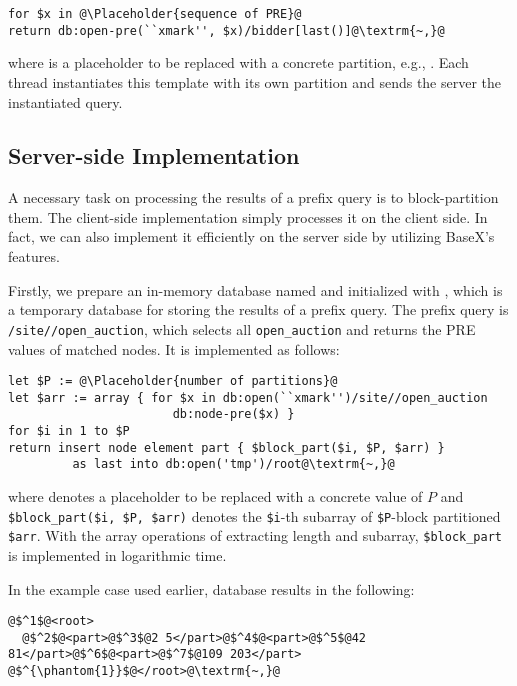 \vspace{10mm}
\begin{lstlisting}[escapechar=\@]
for $x in @\Placeholder{sequence of PRE}@
return db:open-pre(``xmark'', $x)/bidder[last()]@\textrm{~,}@
\end{lstlisting}
where  is a placeholder to be replaced with a
concrete partition, e.g., . Each thread instantiates this template
with its own partition and sends the server the instantiated query.


\subsection{Server-side Implementation}

A necessary task on processing the results of a prefix query is to
block-partition them. The client-side implementation simply processes it on the
client side. In fact, we can also implement it efficiently on the server side by
utilizing BaseX's features.

Firstly, we prepare an in-memory database named  and initialized
with , which is a temporary database for storing the results
of a prefix query. The prefix query is \texttt{/site//open\_auction}, which
selects all \texttt{open\_auction} and returns the PRE values of matched nodes.
It is implemented as follows:

\begin{lstlisting}[escapechar=\@]
let $P := @\Placeholder{number of partitions}@
let $arr := array { for $x in db:open(``xmark'')/site//open_auction
                       db:node-pre($x) }
for $i in 1 to $P
return insert node element part { $block_part($i, $P, $arr) }
         as last into db:open('tmp')/root@\textrm{~,}@
\end{lstlisting}

where  denotes a placeholder to be replaced
with a concrete value of $P$ and \verb|$block_part($i, $P, $arr)| denotes the
\verb|$i|-th subarray of \verb|$P|-block partitioned \verb|$arr|. With the array
operations of extracting length and subarray, \verb|$block_part| is implemented
in logarithmic time.

In the example case used earlier,  database results in the
following:

\newpage
\begin{lstlisting}[escapechar=\@]
@$^1$@<root>
  @$^2$@<part>@$^3$@2 5</part>@$^4$@<part>@$^5$@42 81</part>@$^6$@<part>@$^7$@109 203</part>
@$^{\phantom{1}}$@</root>@\textrm{~,}@
\end{lstlisting}

